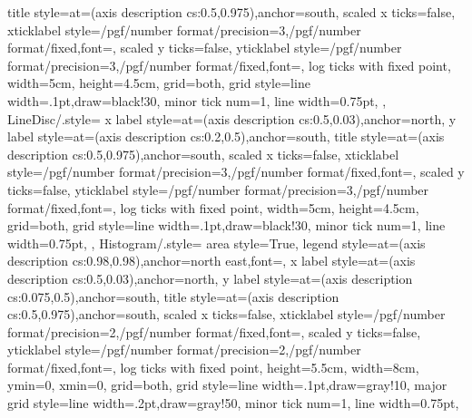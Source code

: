 {{        title style={at={(axis description cs:0.5,0.975)},anchor=south},
        scaled x ticks=false,
        xticklabel style={/pgf/number format/precision=3,/pgf/number format/fixed,font=\small},
        scaled y ticks=false,
        yticklabel style={/pgf/number format/precision=3,/pgf/number format/fixed,font=\small},
        log ticks with fixed point,
        width=5cm,
        height=4.5cm,  
        grid=both,
        grid style={line width=.1pt,draw=black!30},
        minor tick num=1,
        line width=0.75pt,
    },
    LineDisc/.style={
        x label style={at={(axis description cs:0.5,0.03)},anchor=north},
        y label style={at={(axis description cs:0.2,0.5)},anchor=south},
        title style={at={(axis description cs:0.5,0.975)},anchor=south},
        scaled x ticks=false,
        xticklabel style={/pgf/number format/precision=3,/pgf/number format/fixed,font=\small},
        scaled y ticks=false,
        yticklabel style={/pgf/number format/precision=3,/pgf/number format/fixed,font=\small},
        log ticks with fixed point,
        width=5cm,
        height=4.5cm,  
        grid=both,
        grid style={line width=.1pt,draw=black!30},
        minor tick num=1,
        line width=0.75pt,
    },
    Histogram/.style={
        area style=True,
        legend style={at={(axis description cs:0.98,0.98)},anchor=north east,font=\small},
        x label style={at={(axis description cs:0.5,0.03)},anchor=north},
        y label style={at={(axis description cs:0.075,0.5)},anchor=south},
        title style={at={(axis description cs:0.5,0.975)},anchor=south},
        scaled x ticks=false,
        xticklabel style={/pgf/number format/precision=2,/pgf/number format/fixed,font=\small},
        scaled y ticks=false,
        yticklabel style={/pgf/number format/precision=2,/pgf/number format/fixed,font=\small},
        log ticks with fixed point,
        height=5.5cm,
        width=8cm,
        ymin=0,
        xmin=0,
        grid=both,
        grid style={line width=.1pt,draw=gray!10},
        major grid style={line width=.2pt,draw=gray!50},
        minor tick num=1,
        line width=0.75pt,
    }
}